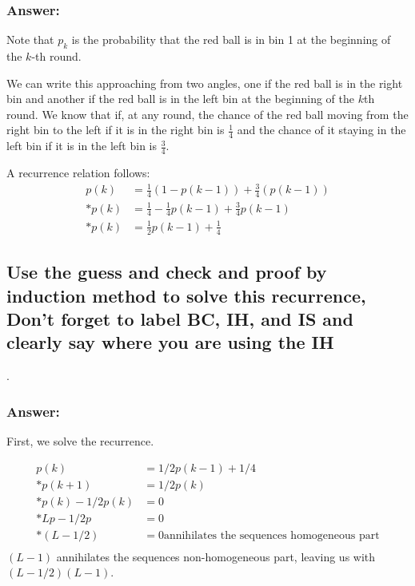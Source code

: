 \documentclass[titlepage]{article}
\theoremstyle{definition}
\begin{document}
  \subsubsection{Answer:}
    Note that $p_k$ is the probability that the red ball is in bin 1 at the beginning of
    the $k$-th round.

    We can write this approaching from two angles, one if the red ball is in the
    right bin and another if the red ball is in the left bin at the beginning of
    the $k$th round. 
    We know that if, at any round, the chance of the red ball moving from the right
    bin to the left if it is in the right bin is $\frac{1}{4}$ and the chance of it
    staying in the left bin if it is in the left bin is $\frac{3}{4}$. 

    A recurrence relation follows:
    \begin{align*}
      p(k) & = \frac{1}{4}\left(1 - p(k-1)\right) + \frac{3}{4}\left(p\left(k-1\right)\right) \\*
      p(k) & = \frac{1}{4} - \frac{1}{4}p(k-1) + \frac{3}{4}p(k-1) \\*
      p(k) & = \frac{1}{2}p(k-1) + \frac{1}{4} 
    \end{align*}


  \subsection{Use the guess and check and proof by induction method to solve this
          recurrence, Don't forget to label BC, IH, and IS and clearly say where you
          are using the IH}.
  \subsubsection{Answer:}
    First, we solve the recurrence.

    \begin{align*}
      p(k) & = 1/2 p(k -1) + 1/4 \\*
      p(k+1) & = 1/2 p(k) \\*
      p(k) - 1/2 p(k) & =  0  \\*
      Lp - 1/2 p & = 0 \\* 
      \left( L - 1/2 \right) & = 0 \text{annihilates the sequences homogeneous part} \\
    \end{align*}
      $ \left(L - 1\right) $ annihilates the sequences non-homogeneous part,
    leaving us with $\left( L - 1/2 \right) \left(L - 1\right)$. 
\end{document}
